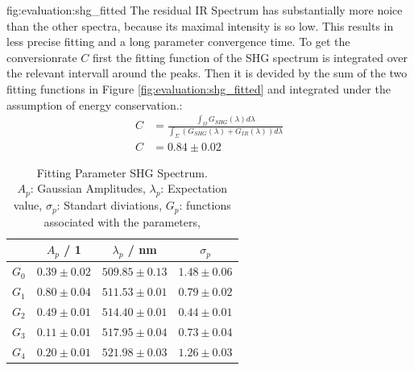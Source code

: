     {fig:evaluation:shg_fitted}
\noindent The residual IR Spectrum has substantially more noice than the other spectra, because its maximal intensity is so low.
This results in less precise fitting and a long parameter convergence time.
To get the conversionrate $C$ first the fitting function of the SHG spectrum is integrated over the relevant intervall around the peaks. 
Then it is devided by the sum of the two fitting functions in Figure \ref{fig:evaluation:shg_fitted} and integrated under the assumption of energy conservation.:
\begin{align}
    C &= \frac{\int_{\varOmega} G_{SHG}(\lambda) d \lambda}{ \int_{\Sigma} (G_{SHG}(\lambda) + G_{IR}(\lambda))d \lambda} \\
    C &= 0.84 \pm 0.02 
\end{align}

\begin{table}[H]
    \label{}
    \centering
    \caption{Fitting Parameter SHG Spectrum. \\
    $A_p$: Gaussian Amplitudes,
    $\lambda_p$: Expectation value,
    $\sigma_p$: Standart diviations,
    $G_p$: functions associated with the parameters,}
    
    \begin{tabular}{c|ccc} \hline
        &  $A_p$ / 1 &  $\lambda_p$ / nm & $\sigma_p$ \\ \hline \hline 
    $G_0$&$0.39 \pm 0.02$&$509.85 \pm 0.13$&$1.48 \pm 0.06$\\ \hline
    $G_1$&$0.80 \pm 0.04$&$511.53 \pm 0.01$&$0.79\pm 0.02$\\ \hline
    $G_2$&$0.49 \pm 0.01$&$514.40 \pm 0.01$&$0.44 \pm 0.01$\\ \hline
    $G_3$&$0.11 \pm 0.01$&$517.95 \pm 0.04$&$0.73 \pm 0.04$\\ \hline
    $G_4$&$0.20 \pm 0.01$&$521.98 \pm 0.03$&$1.26 \pm 0.03$\\ \hline
    \end{tabular}
    \end{table}

